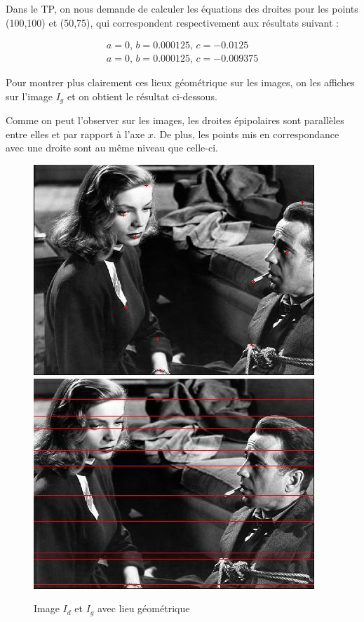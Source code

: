 \documentclass[12pt]{report}
\begin{document}
Dans le TP, on nous demande de calculer les équations des droites pour les points (100,100) et (50,75), qui correspondent respectivement aux résultats suivant :

\[\begin{matrix}
a = 0,\, b = 0.000125, \,c = -0.0125\\ 
a = 0,\, b = 0.000125,\, c = -0.009375
\end{matrix}\] 

Pour montrer plus clairement ces lieux géométrique sur les images, on les affiches sur l'image $I_g$ et on obtient le résultat ci-dessous.

Comme on peut l'observer sur les images, les droites épipolaires sont parallèles entre elles et par rapport à l'axe $x$. De plus, les points mis en correspondance avec une droite sont au même niveau que celle-ci. 

\begin{figure}[H]
\begin{center}
\includegraphics[scale=0.5]{Image/I1d.jpg} 
\includegraphics[scale=0.5]{Image/I1g.jpg} 
\caption{Image $I_d$ et $I_g$ avec lieu géométrique}
\end{center}
\end{figure}
\end{document}
